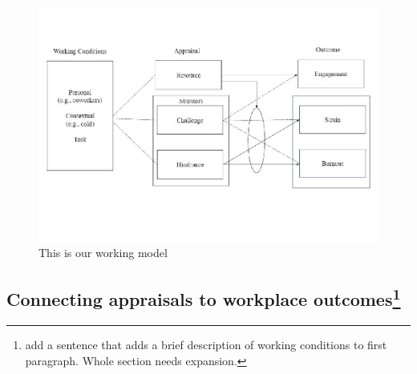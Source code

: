\documentclass[
  jou,mask]{apa6}
\begin{document}
\begin{figure}
\centering
\includegraphics{Submission_files/figure-latex/ourmodel-1.pdf}
\caption{\label{fig:ourmodel}This is our working model}
\end{figure}

\hypertarget{connecting-appraisals-to-workplace-outcomesthought}{%
\subsection[Connecting appraisals to workplace outcomes]{\texorpdfstring{Connecting appraisals to workplace outcomes\footnote{add a sentence that adds a brief description of working conditions to first paragraph. Whole section needs expansion.}}{Connecting appraisals to workplace outcomes}}\label{connecting-appraisals-to-workplace-outcomesthought}}
\end{document}
